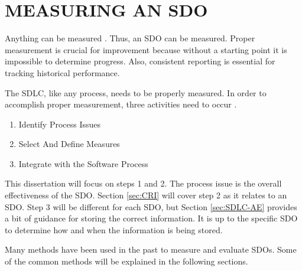 \documentclass[SDSUThesis.tex]{subfiles}
\begin{document}
\section{MEASURING AN SDO}

    Anything can be measured \cite{Hubbard2010}.  Thus, an SDO can be 
    measured.  Proper measurement is crucial for improvement because
    without a starting point it is impossible to determine progress.
    Also, consistent reporting is essential for 
    tracking historical performance.  
    
    The SDLC, like any process, needs to be properly measured.  In
    order to accomplish proper measurement, three activities need
    to occur \cite{florac1999}.  
    
    \begin{enumerate}
        \item Identify Process Issues
        \item Select And Define Measures
        \item Integrate with the Software Process
    \end{enumerate}
    
    This dissertation will focus on steps 1 and 2.  The process issue is the overall
    effectiveness of the SDO.  Section \ref{sec:CRI} will cover step 2 as
    it relates to an SDO.  Step
    3 will be different for each SDO, but Section \ref{sec:SDLC-AE} provides
    a bit of guidance for storing the correct information.  It is up to the
    specific SDO to determine how and when the information is being stored.

    Many methods have been  used in the past 
    to measure and evaluate SDOs.  Some of the common methods
    will be explained in the following sections. 
\end{document}

